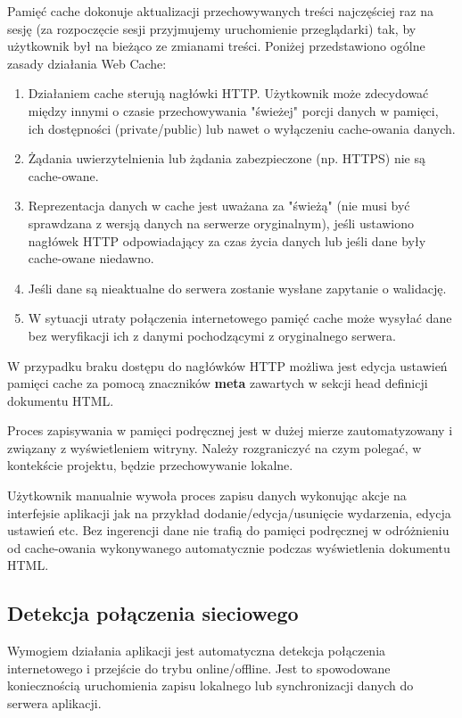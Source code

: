 Pamięć cache dokonuje aktualizacji przechowywanych treści najczęściej raz na sesję (za rozpoczęcie sesji przyjmujemy uruchomienie przeglądarki) tak, by użytkownik był na bieżąco ze zmianami treści. Poniżej przedstawiono ogólne zasady działania Web Cache:

\begin{enumerate}
\item Działaniem cache sterują nagłówki HTTP. Użytkownik może zdecydować między innymi o czasie przechowywania "świeżej" porcji danych w pamięci, ich dostępności (private/public) lub nawet o wyłączeniu cache-owania danych.
\item Żądania uwierzytelnienia lub żądania zabezpieczone (np. HTTPS) nie są cache-owane.
\item Reprezentacja danych w cache jest uważana za "świeżą" (nie musi być sprawdzana z wersją danych na serwerze oryginalnym), jeśli ustawiono nagłówek HTTP odpowiadający za czas życia danych lub jeśli dane były cache-owane niedawno.
\item Jeśli dane są nieaktualne do serwera zostanie wysłane zapytanie o walidację.
\item W sytuacji utraty połączenia internetowego pamięć cache może wysyłać dane bez weryfikacji ich z danymi pochodzącymi z oryginalnego serwera.
\end{enumerate}

W przypadku braku dostępu do nagłówków HTTP możliwa jest edycja ustawień pamięci cache za pomocą znaczników \textbf{meta} zawartych w sekcji head definicji dokumentu HTML.

Proces zapisywania w pamięci podręcznej jest w dużej mierze zautomatyzowany i związany z wyświetleniem witryny. Należy rozgraniczyć na czym polegać, w kontekście projektu, będzie przechowywanie lokalne.

Użytkownik manualnie wywoła proces zapisu danych wykonując akcje na interfejsie aplikacji jak na przykład dodanie/edycja/usunięcie wydarzenia, edycja ustawień etc. Bez ingerencji dane nie trafią do pamięci podręcznej w odróżnieniu od cache-owania wykonywanego automatycznie podczas wyświetlenia dokumentu HTML.

\subsection{Detekcja połączenia sieciowego}
\label{sec:detPolSieciowego}

Wymogiem działania aplikacji jest automatyczna detekcja połączenia internetowego i przejście do trybu online/offline. Jest to spowodowane koniecznością uruchomienia zapisu lokalnego lub synchronizacji danych do serwera aplikacji.

